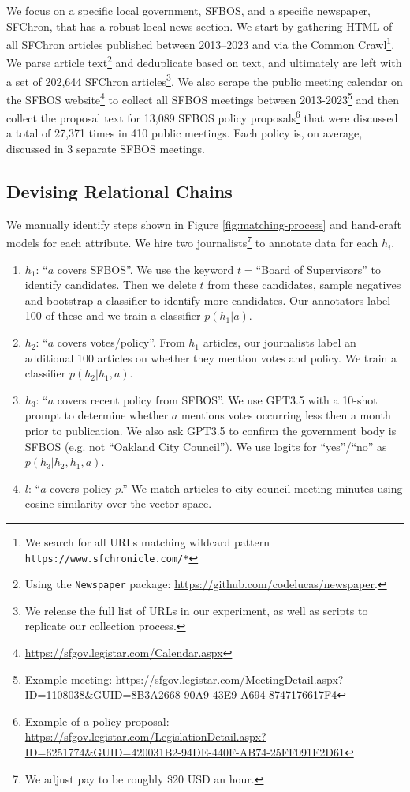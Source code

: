 \documentclass[11pt]{article}
\begin{document}
We focus on a specific local government, SFBOS, and a specific newspaper, SFChron, that has a robust local news section. We start by gathering HTML of all SFChron articles published between 2013--2023 and via the Common Crawl\footnote{We search for all URLs matching wildcard pattern \texttt{https://www.sfchronicle.com/*}}. We parse article text\footnote{Using the \texttt{Newspaper} package: \url{https://github.com/codelucas/newspaper}.} and deduplicate based on text, and ultimately are left with a set of 202,644 SFChron articles\footnote{We release the full list of URLs in our experiment, as well as scripts to replicate our collection process.}. We also scrape the public meeting calendar on the SFBOS website\footnote{\url{https://sfgov.legistar.com/Calendar.aspx}} to collect all SFBOS meetings between 2013-2023\footnote{Example meeting: \url{https://sfgov.legistar.com/MeetingDetail.aspx?ID=1108038&GUID=8B3A2668-90A9-43E9-A694-8747176617F4}} and then collect the proposal text for 13,089 SFBOS policy proposals\footnote{Example of a policy proposal: \url{https://sfgov.legistar.com/LegislationDetail.aspx?ID=6251774&GUID=420031B2-94DE-440F-AB74-25FF091F2D61}} that were discussed a total of 27,371 times in 410 public meetings. Each policy is, on average, discussed in 3 separate SFBOS meetings.

\subsection{Devising Relational Chains}
\label{sct:sct-1:sublinks}
We manually identify steps shown in Figure \ref{fig:matching-process} and hand-craft models for each attribute. %
We hire two journalists\footnote{We adjust pay to be roughly \$20 USD an hour.} to annotate data for each $h_i$. 
\begin{enumerate}
    \item $h_1$: ``$a$ covers SFBOS''. We use the keyword $t = $``Board of Supervisors'' to identify candidates. Then we delete $t$ from these candidates, sample negatives and bootstrap a classifier to identify more candidates. Our annotators label 100 of these and we train a classifier $p(h_1 | a)$.
    \item $h_2$: ``$a$ covers votes/policy''. From $h_1$ articles, our journalists label an additional 100 articles on whether they mention votes and policy. We train a classifier $p(h_2 | h_1, a)$.
    \item $h_3$: ``$a$ covers recent policy from SFBOS''. We use GPT3.5 with a 10-shot prompt to determine whether $a$ mentions votes occurring less then a month prior to publication. We also ask GPT3.5 to confirm the government body is SFBOS (e.g. not ``Oakland City Council''). We use logits for ``yes''/``no'' as $p(h_3 | h_2, h_1, a)$.
    \item $l$: ``$a$ covers policy $p$.'' We match articles to city-council meeting minutes using cosine similarity over the vector space.
\end{enumerate}
\end{document}
